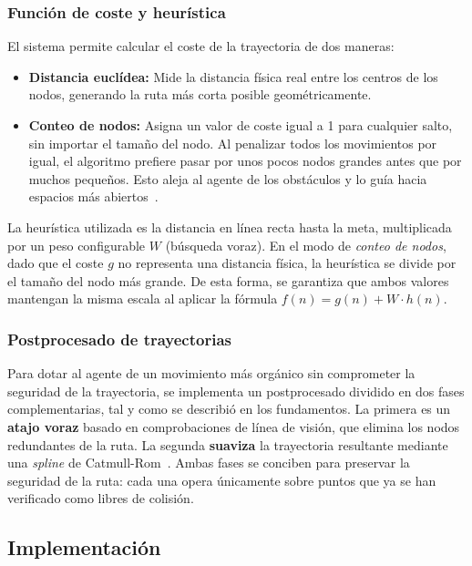 \subsubsection{Función de coste y heurística}

El sistema permite calcular el coste de la trayectoria de dos maneras:

\begin{itemize}
    \item \textbf{Distancia euclídea:} Mide la distancia física real entre los centros de los nodos, generando la ruta más corta posible geométricamente.
    \item \textbf{Conteo de nodos:} Asigna un valor de coste igual a 1 para cualquier salto, sin importar el tamaño del nodo.
    Al penalizar todos los movimientos por igual, el algoritmo prefiere pasar por unos pocos nodos grandes antes que por muchos pequeños.
    Esto aleja al agente de los obstáculos y lo guía hacia espacios más abiertos~\cite{Brewer2015NavMesh}.
\end{itemize}

La heurística utilizada es la distancia en línea recta hasta la meta, multiplicada por un peso configurable $W$ (búsqueda voraz).
En el modo de \textit{conteo de nodos}, dado que el coste $g$ no representa una distancia física, la heurística se divide por el tamaño del nodo más grande.
De esta forma, se garantiza que ambos valores mantengan la misma escala al aplicar la fórmula $f(n) = g(n) + W \cdot h(n)$.

\subsubsection{Postprocesado de trayectorias}
\label{sec:iter-postprocesado}

Para dotar al agente de un movimiento más orgánico sin comprometer la seguridad de la trayectoria, se implementa un postprocesado dividido en dos fases complementarias, tal y como se describió en los fundamentos.
La primera es un \textbf{atajo voraz} basado en comprobaciones de línea de visión, que elimina los nodos redundantes de la ruta.
La segunda \textbf{suaviza} la trayectoria resultante mediante una \textit{spline} de Catmull-Rom~\cite{catmull1974class}.
Ambas fases se conciben para preservar la seguridad de la ruta: cada una opera únicamente sobre puntos que ya se han verificado como libres de colisión.

\subsection{Implementación}


